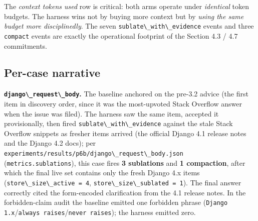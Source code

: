 \begin{table}[!tbp]
\centering
\caption{\textbf{T3 --- P6-B per-case detail.} Sublations fired, compactions, forbidden-claim audit, and final-answer correctness for each of the three Python issues. Source: \texttt{experiments/results/p6b/\_summary.json}.}
\label{tab:t3_p6b}
{\scriptsize\setlength{\tabcolsep}{3pt}%
}
\end{table}

The \emph{context tokens used} row is critical: both arms operate under \emph{identical} token budgets. The harness wins not by buying more context but by \emph{using the same budget more disciplinedly}. The seven \passthrough{\lstinline!sublate\_with\_evidence!} events and three \passthrough{\lstinline!compact!} events are exactly the operational footprint of the Section 4.3 / 4.7 commitments.

\subsection{Per-case narrative}\label{per-case-narrative}

\textbf{\passthrough{\lstinline!django\_request\_body!}.} The baseline anchored on the pre-3.2 advice (the first item in discovery order, since it was the most-upvoted Stack Overflow answer when the issue was filed). The harness saw the same item, accepted it provisionally, then fired \passthrough{\lstinline!sublate\_with\_evidence!} against the stale Stack Overflow snippets as fresher items arrived (the official Django 4.1 release notes and the Django 4.2 docs); per \passthrough{\lstinline!experiments/results/p6b/django\_request\_body.json!} (\passthrough{\lstinline!metrics.sublations!}), this case fires \textbf{3 sublations} and \textbf{1 compaction}, after which the final live set contains only the fresh Django 4.x items (\passthrough{\lstinline!store\_size\_active = 4!}, \passthrough{\lstinline!store\_size\_sublated = 1!}). The final answer correctly cited the form-encoded clarification from the 4.1 release notes. In the forbidden-claim audit the baseline emitted one forbidden phrase (\passthrough{\lstinline!Django 1.x!}/\passthrough{\lstinline!always raises!}/\passthrough{\lstinline!never raises!}); the harness emitted zero.

